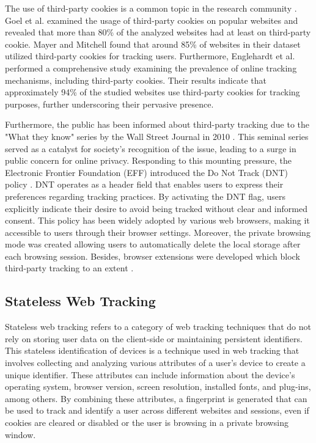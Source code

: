 The use of third-party cookies is a common topic in the research community \cite{mayer2012third,
roesner2012detecting, nikiforakis2013cookieless, west2012analysis,krishnamurthy2006generating,englehardt2015cookies}.
Goel et al. \cite{goel2010anatomy} examined the usage of third-party cookies on popular websites and revealed that more than
80\% of the analyzed websites had at least on third-party cookie. Mayer and Mitchell \cite{mayer2012third} found that around
85\% of websites in their dataset utilized third-party cookies for tracking users. Furthermore, Englehardt et al.
\cite{englehardt2016online} performed a comprehensive study examining the prevalence of online tracking mechanisms, including third-party cookies. Their results indicate 
that approximately 94\% of the studied websites use third-party cookies for tracking purposes,
further underscoring their pervasive presence.

Furthermore, the public has been informed about third-party tracking due to the "What they know" series by the Wall Street Journal
in 2010 \cite{whattheyknow}. This seminal series served as a catalyst for society's recognition of the issue, leading to a surge in public concern for online privacy. Responding to this mounting pressure, the Electronic Frontier Foundation (EFF)
introduced the Do Not Track (DNT) policy \cite{dnt}. DNT operates as a header field that enables users to express
their preferences regarding tracking practices. By activating the DNT flag, users explicitly indicate their
desire to avoid being tracked without clear and informed consent. This policy has been widely adopted by various web browsers,
making it accessible to users through their browser settings. Moreover, the private browsing mode was created allowing users to automatically delete the local 
storage after each browsing session. Besides, browser extensions were developed which block third-party tracking to an extent \cite{ghostery,abp,trackingObserver, shareMeNot}.

\subsection{Stateless Web Tracking}
Stateless web tracking refers to a category of web tracking techniques that do not rely on storing user data on
the client-side or maintaining persistent identifiers. This stateless identification of devices is a technique used
in web tracking that involves collecting and analyzing various attributes of a user's device to create a unique identifier.
These attributes can include information about the device's operating system, browser version, screen resolution,
installed fonts, and plug-ins, among others. By combining these attributes, a fingerprint is generated that can be used to track and
identify a user across different websites and sessions, even if cookies are cleared or disabled or the user is browsing in a private 
browsing window.

